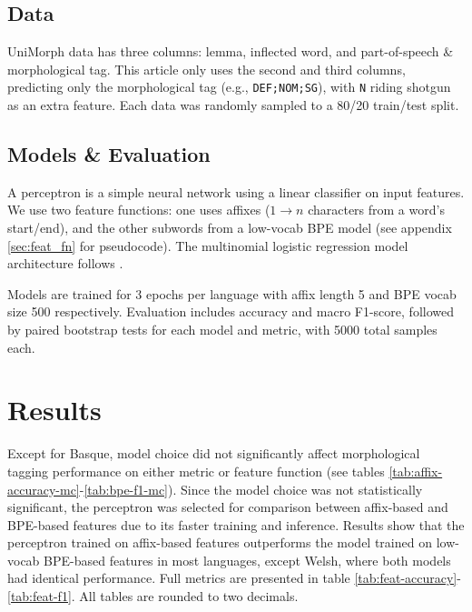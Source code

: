 \documentclass{article}
\begin{document}
\subsection{Data}

UniMorph data has three columns: lemma, inflected word, and part-of-speech \&
morphological tag. This article only uses the second and third columns,
predicting only the morphological tag (e.g., \texttt{DEF;NOM;SG}), with
\texttt{N} riding shotgun as an extra feature. Each data was randomly sampled
to a 80/20 train/test split.

\subsection{Models \& Evaluation}

A perceptron is a simple neural network using a linear classifier on input
features. We use two feature functions: one uses affixes ($1 \rightarrow n$
characters from a word's start/end), and the other subwords from a low-vocab
BPE model (see appendix \ref{sec:feat_fn} for pseudocode). The multinomial
logistic regression model architecture follows \textcite[Ch.5]{jm3}.

Models are trained for 3 epochs per language with affix length 5 and BPE
vocab size 500 respectively. Evaluation includes accuracy and macro F1-score,
followed by paired bootstrap tests \parencite{tibshirani1993} for each model
and metric, with 5000 total samples each.

\section{Results}

Except for Basque, model choice did not significantly affect morphological
tagging performance on either metric or feature function (see tables
\ref{tab:affix-accuracy-mc}-\ref{tab:bpe-f1-mc}). Since the model choice was
not statistically significant, the perceptron was selected for comparison
between affix-based and BPE-based features due to its faster training and
inference. Results show that the perceptron trained on affix-based features
outperforms the model trained on low-vocab BPE-based features in most
languages, except Welsh, where both models had identical performance. Full
metrics are presented in table \ref{tab:feat-accuracy}-\ref{tab:feat-f1}. All
tables are rounded to two decimals.
\end{document}
